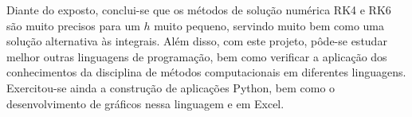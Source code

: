 \documentclass[a4paper,11pt]{article}
\begin{document}
    Diante do exposto, conclui-se que os métodos de solução numérica RK4 e RK6 são muito precisos para um $h$ muito pequeno, servindo muito bem como uma solução alternativa às integrais. Além disso, com este projeto, pôde-se estudar melhor outras linguagens de programação, bem como verificar a aplicação dos conhecimentos da disciplina de métodos computacionais em diferentes linguagens. Exercitou-se ainda a construção de aplicações Python, bem como o desenvolvimento de gráficos nessa linguagem e em Excel.

\pagebreak


\nocite{Overleaf}
\nocite{Julia_Operadores}
\nocite{Julia_Introducao}
\nocite{Julia_Data_Frame}
\nocite{Julia_arrays}
\nocite{Julia_funcoes}
\nocite{Matplotlib}
\nocite{Deploy}
\nocite{Stcolumns}
\nocite{Stvideo}
\nocite{Ar}
\nocite{API}
\nocite{Stlatex}
\nocite{Cplusplus}


\printbibliography
\end{document}
